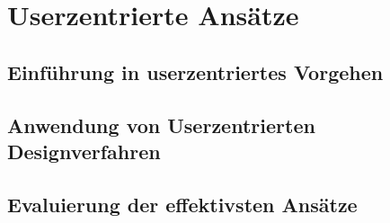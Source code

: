 \section{Userzentrierte Ansätze}

\subsection{Einführung in userzentriertes Vorgehen}

\subsection{Anwendung von Userzentrierten Designverfahren}

\subsection{Evaluierung der effektivsten Ansätze}
